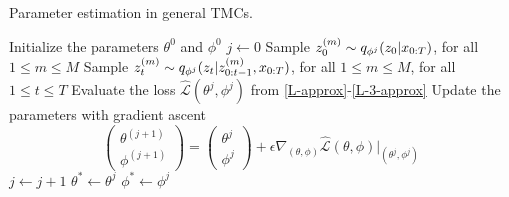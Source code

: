 \begin{algorithm}[htbp!]
  \caption{Parameter estimation  in general  TMCs.}
  \label{algo:tmc_elbo_opt}
\begin{algorithmic}[1]
  \State Initialize the parameters $\theta^0$ and $\phi^0$
  \State $j\leftarrow 0$\label{line:start_dtmc}
    \State Sample $z_0^{(m)}\sim q_{\phi^{{j}}}(z_0|x_{0:T})$,  for all  $1 \leq m \leq M$ 
    \State Sample $z_t^{(m)}\sim q_{\phi^{{j}}}(z_t|z_{0:t-1}^{(m)},x_{0:T})$,   for all  $1 \leq m \leq M$, for all $1 \leq t \leq T$ 
    \State Evaluate the loss $\widehat{\mathcal{L}}(\theta^{{j}},\phi^{{j}})$ from \eqref{L-approx}-\eqref{L-3-approx}
    \State Update the parameters with gradient ascent
  \begin{equation}
  \begin{pmatrix}\theta^{(j+1)}\\\phi^{(j+1)}\end{pmatrix}=
  \begin{pmatrix}\theta^{{j}}\\\phi^{{j}}\end{pmatrix}
  + \epsilon {\nabla_{(\theta, \phi)} \widehat{\mathcal{L}}(\theta,\phi)}\Big|_{(\theta^{{j}},\phi^{{j}})}
  \label{eq:elbo_grad}
  \end{equation}
  \State  $j\leftarrow j+1$
  \EndWhile
  \State  $\theta^{*} \leftarrow \theta^{{j}}$
  \State  $\phi^{*} \leftarrow \phi^{{j}}$
  \label{line:end_dtmc}
\end{algorithmic}
\end{algorithm}


